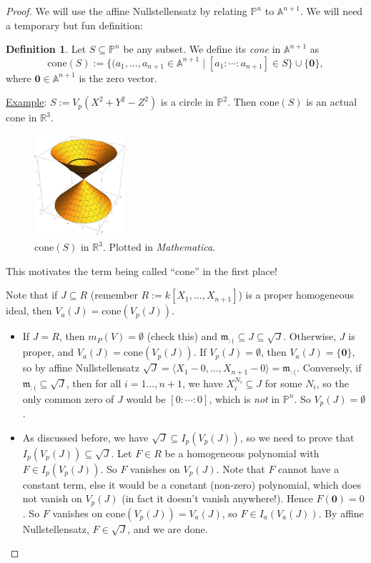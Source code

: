 \documentclass[12pt]{article}
\newcommand{\real}{\mathbb{R}}
\newcommand{\ita}[1]{\textit{#1}}
\newcommand{\vbrack}[1]{\langle #1\rangle}
\theoremstyle{definition}
\newtheorem{definition}[theorem]{Definition}
\begin{document}
\begin{proof}
    We will use the affine Nullstellensatz by relating $\mathbb{P}^n$ to $\mathbb{A}^{n+1}$. We will need a temporary but fun definition:
    \begin{definition}
        Let $S\subseteq\mathbb{P}^n$ be any subset. We define its \ita{cone} in $\mathbb{A}^{n+1}$ as 
        \begin{equation}
            \mathrm{cone}(S):=\{(a_1,\dotsc,a_{n+1}\in\mathbb{A}^{n+1}\mid [a_1:\cdots:a_{n+1}]\in S\}\cup\{\mathbf{0}\},
        \end{equation}
        where $\mathbf{0}\in\mathbb{A}^{n+1}$ is the zero vector.
    \end{definition}
    \underline{Example}: $S:=V_p(X^2+Y^2-Z^2)$ is a circle in $\mathbb{P}^2$. Then $\mathrm{cone}(S)$ is an actual cone in $\real^3$.
    \begin{figure}[H]
        \centering \includegraphics[width=0.3\textwidth]{29.pdf}
        \caption{$\mathrm{cone}(S)$ in $\real^3$. Plotted in \ita{Mathematica}.}
    \end{figure}
    This motivates the term being called ``cone'' in the first place!
    
    Note that if $J\subseteq R$ (remember $R:=k[X_1,\dotsc,X_{n+1}]$) is a proper homogeneous ideal, then $V_a(J)=\mathrm{cone}(V_p(J))$.
    \begin{itemize}
        \item If $J=R$, then $m_P(V)=\emptyset$ (check this) and $\mathfrak{m}_{:(}\subseteq J\subseteq\sqrt{J}$. Otherwise, $J$ is proper, and $V_a(J)=\mathrm{cone}(V_p(J))$. If $V_p(J)=\emptyset$, then $V_a(J)=\{\mathbf{0}\}$, so by affine Nullstellensatz $\sqrt{J}=\vbrack{X_1-0,\dotsc,X_{n+1}-0}=\mathfrak{m}_{:(}$. Conversely, if $\mathfrak{m}_{:(}\subseteq\sqrt{J}$, then for all $i=1\dotsc,n+1$, we have $X_i^{N_i}\subseteq J$ for some $N_i$, so the only common zero of $J$ would be $[0:\cdots:0]$, which is \ita{not} in $\mathbb{P}^n$. So $V_p(J)=\emptyset$. \checkmark
        \item As discussed before, we have $\sqrt{J}\subseteq I_p(V_p(J))$, so we need to prove that $I_p(V_p(J))\subseteq\sqrt{J}$. Let $F\in R$ be a homogeneous polynomial with $F\in I_p(V_p(J))$. So $F$ vanishes on $V_p(J)$. Note that $F$ cannot have a constant term, else it would be a constant (non-zero) polynomial, which does not vanish on $V_p(J)$ (in fact it doesn't vanish anywhere!). Hence $F(\mathbf{0})=0$. So $F$ vanishes on $\mathrm{cone}(V_p(J))=V_a(J)$, so $F\in I_a(V_a(J))$. By affine Nullstellensatz, $F\in\sqrt{J}$, and we are done. \checkmark
    \end{itemize}
\end{proof}
\end{document}
